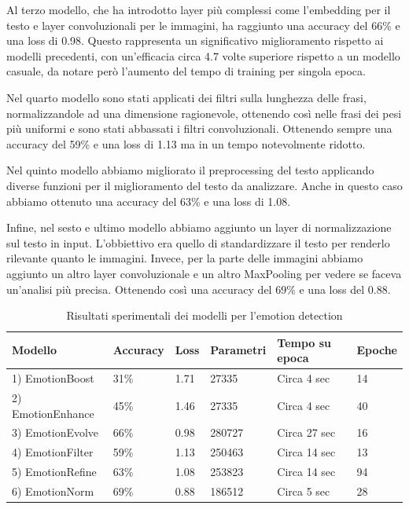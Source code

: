 \documentclass{article}
\begin{document}
Al terzo modello, che ha introdotto layer più complessi come l'embedding per il testo e layer convoluzionali per le immagini, ha raggiunto una accuracy del 66\% e una loss di 0.98. Questo rappresenta un significativo miglioramento rispetto ai modelli precedenti, con un'efficacia circa 4.7 volte superiore rispetto a un modello casuale, da notare però l'aumento del tempo di training per singola epoca.

\bigskip

Nel quarto modello sono stati applicati dei filtri sulla lunghezza delle frasi, normalizzandole ad una dimensione ragionevole, ottenendo così nelle frasi dei pesi più uniformi e sono stati abbassati i filtri convoluzionali. Ottenendo sempre una accuracy del 59\% e una loss di 1.13 ma in un tempo notevolmente ridotto.

\bigskip


Nel quinto modello abbiamo migliorato il preprocessing del testo applicando diverse funzioni per il miglioramento del testo da analizzare. Anche in questo caso abbiamo ottenuto una accuracy del 63\% e una loss di 1.08.

\bigskip


Infine, nel sesto e ultimo modello abbiamo aggiunto un layer di normalizzazione sul testo in input. L'obbiettivo era quello di standardizzare il testo per renderlo rilevante quanto le immagini. Invece, per la parte delle immagini abbiamo aggiunto un altro layer convoluzionale e un altro MaxPooling per vedere se faceva un'analisi più precisa. Ottenendo così una accuracy del 69\% e una loss del $0.88$.

\begin{table}[H]
\begin{adjustwidth}{-0.5cm}{}
\centering
\begin{tabular}{@{}llllll@{}}
\toprule
\textbf{Modello} & \textbf{Accuracy} & \textbf{Loss} & \textbf{Parametri} & \textbf{Tempo su epoca} & \textbf{Epoche}  \\ \midrule
1) EmotionBoost & 31\% & 1.71 & 27335 & Circa 4 sec  & 14 \\
2) EmotionEnhance & 45\% & 1.46 & 27335 & Circa 4 sec & 40 \\
3) EmotionEvolve & 66\% & 0.98 & 280727 & Circa 27 sec & 16 \\
4) EmotionFilter & 59\% & 1.13 & 250463 & Circa 14 sec & 13 \\
5) EmotionRefine & 63\% & 1.08 & 253823 & Circa 14 sec & 94 \\
6) EmotionNorm & 69\% & 0.88 & 186512 & Circa 5 sec & 28\\ \bottomrule
\end{tabular}
\caption{Risultati sperimentali dei modelli per l'emotion detection}
\label{tab:results}
\end{adjustwidth}
\end{table}
\end{document}
